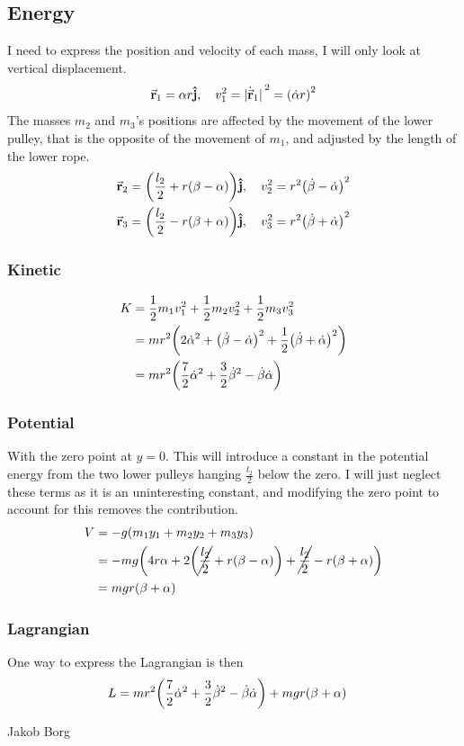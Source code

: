 \documentclass[11pt,a4paper]{report}
\newcounter{excount}[chapter]
\newenvironment{exercise}[1][]{\addtocounter{excount}{1} \noindent {\bf Problem
    \arabic{excount} \ \ #1}\hspace{2mm}}{\vspace{4mm}}
\newenvironment{solution}
    {\begin{tcolorbox}[title=Solution,halign lower=right,breakable]
    }
    {
    \tcblower Jakob Borg
    \end{tcolorbox}
	\vspace{5mm}
    }
\newcommand{\half}
{
\frac{1}{2}
}
\begin{document}
\begin{exercise}
\begin{solution}
\subsection*{Energy}
I need to express the position and velocity of each mass, I will only look at vertical displacement.
\begin{equation*}
	\va{r}_1 = \alpha r \vu{j} \qc v_1^2 = \abs*{\dot{\va{r}}_1}^2 = \qty (\dot{\alpha}r)^2
\end{equation*}
The masses $m_2$ and $m_3$'s positions are affected by the movement of the lower pulley, that is the opposite of the movement of $m_1$, and adjusted by the length of the lower rope.
\begin{align*}
	\va{r}_2 &= \qty(\frac{l_2}{2}+r\qty(\beta-\alpha))\vu{j} \qc v_2^2 = r^2\qty(\dot{\beta} - \dot{\alpha})^2
	\\
	\va{r}_3 &= \qty(\frac{l_2}{2}-r\qty(\beta+\alpha))\vu{j} \qc v_3^2 = r^2\qty(\dot{\beta} + \dot{\alpha})^2	
\end{align*} 
\subsubsection*{Kinetic}
\begin{align*}
	K &= \frac{1}{2}m_1v_1^2 + \half m_2 v_2^2 + \half m_3v_3^2
	\\
	&= mr^2\qty(2\dot{\alpha}^2 + \qty(\dot{\beta}-\dot{\alpha})^2 + \half \qty(\dot{\beta} + \dot{\alpha})^2)
	\\
	&= mr^2 \qty( \frac{7}{2}\dot{\alpha}^2 + \frac{3}{2}\dot{\beta}^2 - \dot{\beta}\dot{\alpha})
\end{align*}
\subsubsection*{Potential}
With the zero point at $y=0$. This will introduce a constant in the potential energy from the two lower pulleys hanging $\frac{l_2}{2}$ below the zero. I will just neglect these terms as it is an uninteresting constant, and modifying the zero point to account for this removes the contribution.
\begin{align*}
	V &= -g \qty ( m_1y_1 + m_2y_2 + m_3y_3)
	\\
	&= -mg \qty(4r\alpha + 2\qty(\cancel{\frac{l_2}{2}} + r\qty(\beta - \alpha)) + \cancel{\frac{l_2}{2}} -r\qty(\beta+ \alpha))
	\\
	&= mgr \qty(\beta+\alpha)
\end{align*}
\subsubsection*{Lagrangian}
One way to express the Lagrangian is then
\begin{align*}
	L &= mr^2 \qty(\frac{7}{2}\dot{\alpha}^2+\frac{3}{2}\dot{\beta}^2 -\dot{\beta}\dot{\alpha}) + mgr\qty(\beta + \alpha)
\end{align*}
\end{solution}
\end{exercise}
\end{document}
